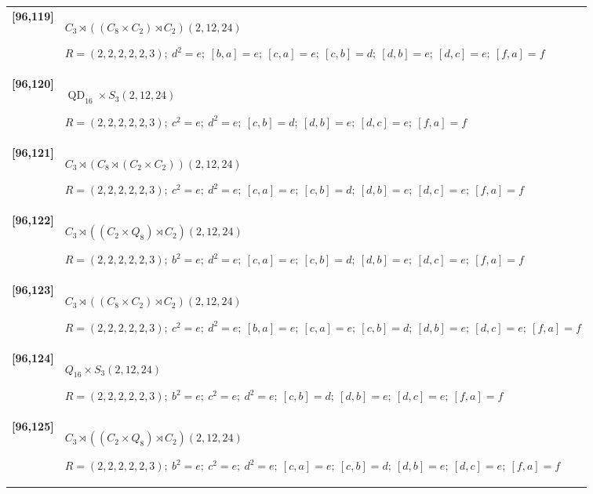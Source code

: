 \documentclass[UTF8,fontset=fandol,11pt,a4paper]{ctexart}
\begin{document}
\begin{longtable}{@{}p{17mm}>{\raggedright\arraybackslash}p{141mm}@{}}
\textbf{[96,119]} & $C_{3}\rtimes ((C_{8}\times C_{2})\rtimes C_{2})$\quad $(2,12,24)$\par\(R=(2,2,2,2,2,3);\allowbreak\ d^{2}=e;\allowbreak\ [b,a]=e;\allowbreak\ [c,a]=e;\allowbreak\ [c,b]=d;\allowbreak\ [d,b]=e;\allowbreak\ [d,c]=e;\allowbreak\ [f,a]=f\)\\[3pt]

\textbf{[96,120]} & $\operatorname{QD}_{16}\times S_{3}$\quad $(2,12,24)$\par\(R=(2,2,2,2,2,3);\allowbreak\ c^{2}=e;\allowbreak\ d^{2}=e;\allowbreak\ [c,b]=d;\allowbreak\ [d,b]=e;\allowbreak\ [d,c]=e;\allowbreak\ [f,a]=f\)\\[3pt]

\textbf{[96,121]} & $C_{3}\rtimes (C_{8}\rtimes (C_{2}\times C_{2}))$\quad $(2,12,24)$\par\(R=(2,2,2,2,2,3);\allowbreak\ c^{2}=e;\allowbreak\ d^{2}=e;\allowbreak\ [c,a]=e;\allowbreak\ [c,b]=d;\allowbreak\ [d,b]=e;\allowbreak\ [d,c]=e;\allowbreak\ [f,a]=f\)\\[3pt]

\textbf{[96,122]} & $C_{3}\rtimes ((C_{2}\times Q_{8})\rtimes C_{2})$\quad $(2,12,24)$\par\(R=(2,2,2,2,2,3);\allowbreak\ b^{2}=e;\allowbreak\ d^{2}=e;\allowbreak\ [c,a]=e;\allowbreak\ [c,b]=d;\allowbreak\ [d,b]=e;\allowbreak\ [d,c]=e;\allowbreak\ [f,a]=f\)\\[3pt]

\textbf{[96,123]} & $C_{3}\rtimes ((C_{8}\times C_{2})\rtimes C_{2})$\quad $(2,12,24)$\par\(R=(2,2,2,2,2,3);\allowbreak\ c^{2}=e;\allowbreak\ d^{2}=e;\allowbreak\ [b,a]=e;\allowbreak\ [c,a]=e;\allowbreak\ [c,b]=d;\allowbreak\ [d,b]=e;\allowbreak\ [d,c]=e;\allowbreak\ [f,a]=f\)\\[3pt]

\textbf{[96,124]} & $Q_{16}\times S_{3}$\quad $(2,12,24)$\par\(R=(2,2,2,2,2,3);\allowbreak\ b^{2}=e;\allowbreak\ c^{2}=e;\allowbreak\ d^{2}=e;\allowbreak\ [c,b]=d;\allowbreak\ [d,b]=e;\allowbreak\ [d,c]=e;\allowbreak\ [f,a]=f\)\\[3pt]

\textbf{[96,125]} & $C_{3}\rtimes ((C_{2}\times Q_{8})\rtimes C_{2})$\quad $(2,12,24)$\par\(R=(2,2,2,2,2,3);\allowbreak\ b^{2}=e;\allowbreak\ c^{2}=e;\allowbreak\ d^{2}=e;\allowbreak\ [c,a]=e;\allowbreak\ [c,b]=d;\allowbreak\ [d,b]=e;\allowbreak\ [d,c]=e;\allowbreak\ [f,a]=f\)\\[3pt]


\end{longtable}
\end{document}
